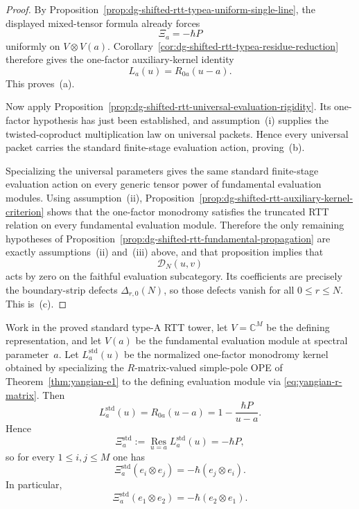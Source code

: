 \begin{proof}
By
Proposition~\ref{prop:dg-shifted-rtt-typea-uniform-single-line},
the displayed mixed-tensor formula already forces
\[
\Xi_a=-\hbar P
\]
uniformly on $V\otimes V(a)$. Corollary~\ref{cor:dg-shifted-rtt-typea-residue-reduction}
therefore gives the one-factor auxiliary-kernel identity
\[
L_a(u)=R_{0a}(u-a).
\]
This proves~\textup{(a)}.

Now apply
Proposition~\ref{prop:dg-shifted-rtt-universal-evaluation-rigidity}.
Its one-factor hypothesis has just been established, and
assumption~\textup{(i)} supplies the twisted-coproduct multiplication
law on universal packets. Hence every universal packet carries the
standard finite-stage evaluation action, proving~\textup{(b)}.

Specializing the universal parameters gives the same standard
finite-stage evaluation action on every generic tensor power of
fundamental evaluation modules. Using assumption~\textup{(ii)},
Proposition~\ref{prop:dg-shifted-rtt-auxiliary-kernel-criterion}
shows that the one-factor monodromy satisfies the truncated RTT
relation on every fundamental evaluation module. Therefore the only
remaining hypotheses of
Proposition~\ref{prop:dg-shifted-rtt-fundamental-propagation}
are exactly assumptions~\textup{(ii)} and~\textup{(iii)} above, and
that proposition implies that
\[
\mathcal{D}_N(u,v)
\]
acts by zero on the faithful evaluation subcategory. Its coefficients
are precisely the boundary-strip defects
$\Delta_{r,0}(N)$, so those defects vanish for all $0\le r\le N$.
This is~\textup{(c)}.
\end{proof}

\begin{proposition}
\label{prop:dg-shifted-rtt-standard-typea-local-packet}
Work in the proved standard type-A RTT tower, let
$V=\mathbb{C}^M$ be the defining representation, and let $V(a)$ be the
fundamental evaluation module at spectral parameter~$a$. Let
$L_a^{\mathrm{std}}(u)$ be the normalized one-factor monodromy kernel
obtained by specializing the $R$-matrix-valued simple-pole OPE of
Theorem~\ref{thm:yangian-e1} to the defining evaluation module via
\eqref{eq:yangian-r-matrix}. Then
\[
L_a^{\mathrm{std}}(u)=R_{0a}(u-a)=1-\frac{\hbar P}{u-a}.
\]
Hence
\[
\Xi_a^{\mathrm{std}}
:=
\operatorname*{Res}_{u=a}L_a^{\mathrm{std}}(u)
=-\hbar P,
\]
so for every $1\le i,j\le M$ one has
\[
\Xi_a^{\mathrm{std}}(e_i\otimes e_j)=-\hbar(e_j\otimes e_i).
\]
In particular,
\[
\Xi_a^{\mathrm{std}}(e_1\otimes e_2)=-\hbar(e_2\otimes e_1).
\]
\end{proposition}


